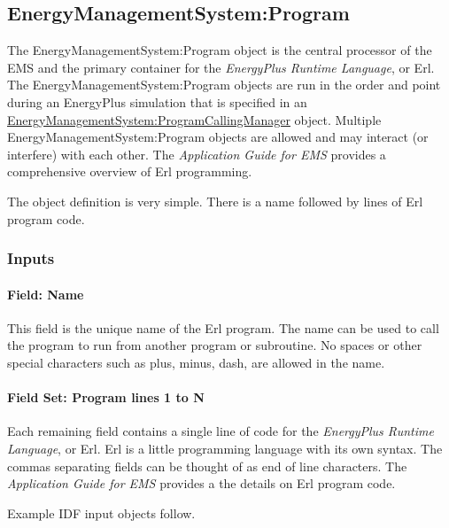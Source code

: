 \subsection{EnergyManagementSystem:Program}\label{energymanagementsystemprogram}

The EnergyManagementSystem:Program object is the central processor of the EMS and the primary container for the \emph{EnergyPlus Runtime Language}, or Erl. The EnergyManagementSystem:Program objects are run in the order and point during an EnergyPlus simulation that is specified in an \hyperref[energymanagementsystemprogramcallingmanager]{EnergyManagementSystem:ProgramCallingManager} object. Multiple EnergyManagementSystem:Program objects are allowed and may interact (or interfere) with each other. The \emph{Application Guide for EMS} provides a comprehensive overview of Erl programming.

The object definition is very simple. There is a name followed by lines of Erl program code.

\subsubsection{Inputs}\label{inputs-3-011}

\paragraph{Field: Name}\label{field-name-3-010}

This field is the unique name of the Erl program. The name can be used to call the program to run from another program or subroutine. No spaces or other special characters such as plus, minus, dash, are allowed in the name.

\paragraph{Field Set: Program lines 1 to N}\label{field-set-program-lines-1-to-n}

Each remaining field contains a single line of code for the \emph{EnergyPlus Runtime Language}, or Erl. Erl is a little programming language with its own syntax. The commas separating fields can be thought of as end of line characters. The \emph{Application Guide for EMS} provides a the details on Erl program code.

Example IDF input objects follow.

